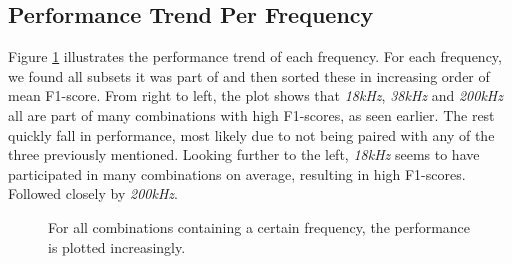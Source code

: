        
    \subsection{Performance Trend Per Frequency} 
        Figure \ref{performance_trend_fig} illustrates the performance trend of each frequency. For each frequency, we found all subsets it was part of and then sorted these in increasing order of mean F1-score. From right to left, the plot shows that \textit{18kHz}, \textit{38kHz} and \textit{200kHz} all are part of many combinations with high F1-scores, as seen earlier. The rest quickly fall in performance, most likely due to not being paired with any of the three previously mentioned. Looking further to the left, \textit{18kHz} seems to have participated in many combinations on average, resulting in high F1-scores. Followed closely by \textit{200kHz}.
        \begin{figure}[H]
            \centering
            
            \caption[Performance trend per frequency]{For all combinations containing a certain frequency, the performance is plotted increasingly.}
          	\medskip 
            \label{performance_trend_fig}
        \end{figure}
        
        
    

    
    
